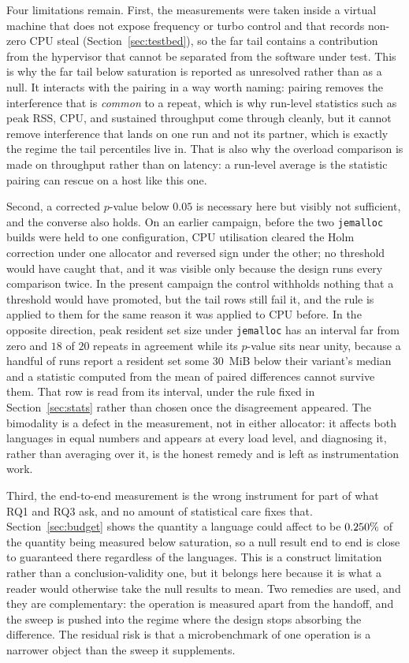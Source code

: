 \documentclass[english,twoside,openright,a4paper,censored,csm,software-track-2020]{HYthesisML}
\begin{document}
Four limitations remain. First, the measurements were taken inside a virtual machine that does not
expose frequency or turbo control and that records non-zero CPU steal
(Section~\ref{sec:testbed}), so the far tail contains a contribution from the hypervisor that
cannot be separated from the software under test. This is why the far tail below saturation is
reported as unresolved rather than as a null. It interacts with the pairing in a way worth naming:
pairing removes the interference that is \emph{common} to a repeat, which is why run-level
statistics such as peak RSS, CPU, and sustained throughput come through cleanly, but it cannot
remove interference that lands on one run and not its partner, which is exactly the regime the
tail percentiles live in. That is also why the overload comparison is made on throughput rather
than on latency: a run-level average is the statistic pairing can rescue on a host like this one.

Second, a corrected $p$-value below $0.05$ is necessary here but visibly not sufficient, and the
converse also holds. On an earlier campaign, before the two \texttt{jemalloc} builds were held to
one configuration, CPU utilisation cleared the Holm correction under one allocator and reversed
sign under the other; no threshold would have caught that, and it was visible only because the
design runs every comparison twice. In the present campaign the control withholds nothing that a
threshold would have promoted, but the tail rows still fail it, and the rule is applied to them
for the same reason it was applied to CPU before. In the opposite direction, peak resident set
size under \texttt{jemalloc} has an interval far from zero and $18$ of $20$ repeats in agreement
while its $p$-value sits near unity, because a handful of runs report a resident set some $30$~MiB
below their variant's median and a statistic computed from the mean of paired differences cannot
survive them. That row is read from its interval, under the rule fixed in
Section~\ref{sec:stats} rather than chosen once the disagreement appeared. The bimodality is a
defect in the measurement, not in either allocator: it affects both languages in equal numbers and
appears at every load level, and diagnosing it, rather than averaging over it, is the honest
remedy and is left as instrumentation work.

Third, the end-to-end measurement is the wrong instrument for part of what RQ1 and RQ3 ask, and
no amount of statistical care fixes that. Section~\ref{sec:budget} shows the quantity a
language could affect to be $0.250\%$ of the quantity being measured below
saturation, so a null result end to end is close to guaranteed there regardless of the languages.
This is a construct limitation rather than a conclusion-validity one, but it belongs here because
it is what a reader would otherwise take the null results to mean. Two remedies are used, and they
are complementary: the operation is measured apart from the handoff, and the sweep is pushed into
the regime where the design stops absorbing the difference. The residual risk is that a
microbenchmark of one operation is a narrower object than the sweep it supplements.
\end{document}
